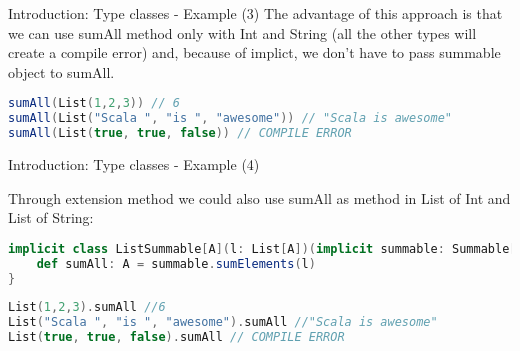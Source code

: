 \begin{frame}[fragile]{Introduction: Type classes - Example (3)}
	The advantage of this approach is that we can use sumAll method only with Int and String (all the other types will create 
	a compile error) and, because of implict, we don't have to pass summable object to sumAll.
	
\begin{lstlisting}[language=scala]
sumAll(List(1,2,3)) // 6
sumAll(List("Scala ", "is ", "awesome")) // "Scala is awesome"
sumAll(List(true, true, false)) // COMPILE ERROR				
\end{lstlisting}

\end{frame}
	
\begin{frame}[fragile]{Introduction: Type classes - Example (4)}
	
	Through extension method we could also use sumAll as method in List of Int and List of String:
\begin{lstlisting}[language=scala]
implicit class ListSummable[A](l: List[A])(implicit summable: Summable[A]) {
	def sumAll: A = summable.sumElements(l)
}
\end{lstlisting}	
	
	\pause
	
\begin{lstlisting}[language=scala]
List(1,2,3).sumAll //6
List("Scala ", "is ", "awesome").sumAll //"Scala is awesome"
List(true, true, false).sumAll // COMPILE ERROR
\end{lstlisting}
\end{frame}